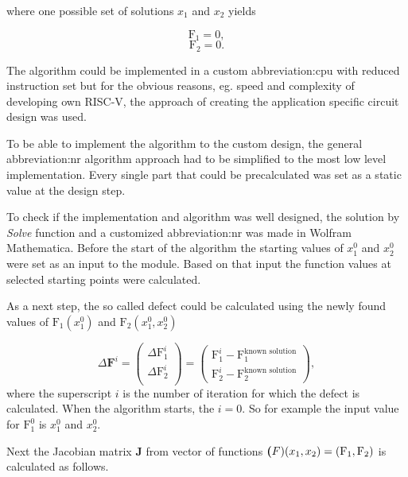 \documentclass[a4paper, twoside, 11pt]{article}
\begin{document}
        where one possible set of solutions $x_1$ and $x_2$ yields

        \begin{equation}
            \text{F}_1 = 0, 
        \end{equation}
        \begin{equation}
            \text{F}_2 = 0.
        \end{equation}

        \par
        The algorithm could be implemented in a custom \gls{abbreviation:cpu} with reduced instruction set but for the obvious reasons, eg. speed and complexity of developing own RISC-V, the approach of creating the application specific circuit design was used.\par
        To be able to implement the algorithm to the custom design, the general \gls{abbreviation:nr} algorithm approach had to be simplified to the most low level implementation. Every single part that could be precalculated was set as a static value at the design step.\par
        To check if the implementation and algorithm was well designed, the solution by \textit{Solve} function and a customized \gls{abbreviation:nr} was made in Wolfram Mathematica. Before the start of the algorithm the starting values of $x_1^0$ and $x_2^0$ were set as an input to the module. Based on that input the function values at selected starting points were calculated.\par
        As a next step, the so called defect could be calculated using the newly found values of $\text{F}_1 (x_1^0)$ and $\text{F}_2 (x_1^0, x_2^0)$

        \begin{equation}
            \Delta \textbf{F}^i =
            \begin{pmatrix}
                \Delta \text{F}_1^i\\
                \Delta \text{F}_2^i\\
            \end{pmatrix}
            =
            \begin{pmatrix}
                \text{F}_1^i - \text{F}_1^{\text{known solution}}\\
                \text{F}_2^i - \text{F}_2^{\text{known solution}}
            \end{pmatrix},
        \end{equation}
        where the superscript $i$ is the number of iteration for which the defect is calculated. When the algorithm starts, the $i = 0$. So for example the input value for $\text{F}_1^0$ is $x_1^0$ and $x_2^0$.\par
        Next the Jacobian matrix \textbf{J} from vector of functions $\textbf(F)(x_1, x_2) = (\text{F}_1, \text{F}_2)$ is calculated as follows.
\end{document}
